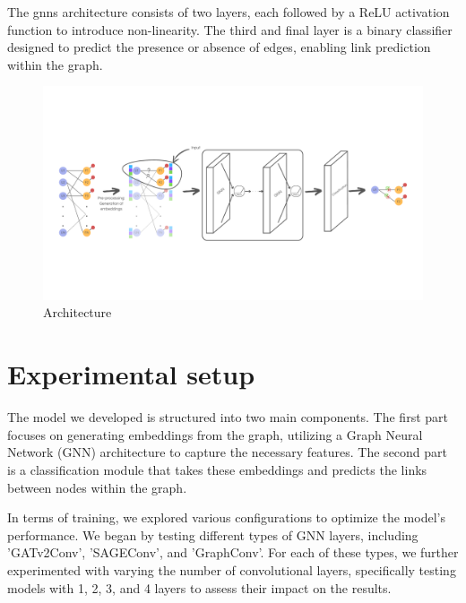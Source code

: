 \documentclass[11pt]{article}
\begin{document}
The \acp{gnn} architecture consists of two layers, each followed by a ReLU activation 
function to introduce non-linearity. The third and final layer is a binary classifier 
designed to predict the presence or absence of edges, enabling link prediction within the 
graph.



\begin{figure}
  \centering
  \includegraphics[width=1\linewidth]{figures/architecture.pdf}

  \caption{
    Architecture
  }
  \label{fig:architecture}
\end{figure}

\section{Experimental setup}\label{sec:experimental-setup}

The model we developed is structured into two main components. 
%
The first part focuses on generating embeddings from the graph, 
  utilizing a Graph Neural Network (GNN) architecture to capture the necessary features. 
%  
The second part is a classification module that takes these embeddings and predicts the links 
  between nodes within the graph.

In terms of training, we explored various configurations to optimize the model's performance.
%
We began by testing different types of GNN layers, including 'GATv2Conv', 'SAGEConv', and 'GraphConv'. 
%
For each of these types, we further experimented with varying the number of convolutional layers, 
  specifically testing models with 1, 2, 3, and 4 layers to assess their impact on the results.







\end{document}
